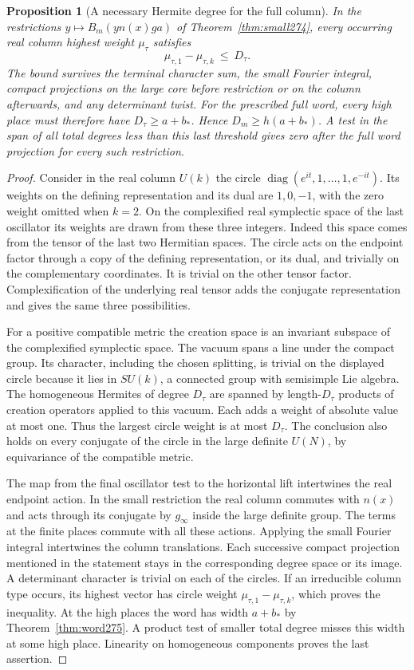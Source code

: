 \documentclass[a4paper,11pt]{article}
\newtheorem{proposition}{Proposition}[section]
\theoremstyle{definition}
\theoremstyle{remark}
\numberwithin{equation}{section}
\begin{document}
\begin{proposition}[A necessary Hermite degree for the full column]\leavevmode
\label{prop:degree275}
In the restrictions \(y\mapsto B_m(y n(x)g a)\) of
Theorem~\ref{thm:small274}, every occurring real column
highest weight \(\mu_\tau\) satisfies
\[
         \mu_{\tau,1}-\mu_{\tau,k}\ \le\ D_\tau .
\]
The bound survives the terminal character sum, the small
Fourier integral, compact projections on the large core
before restriction or on the column afterwards, and any
determinant twist. For the prescribed full word, every high
place must therefore have \(D_\tau\ge a+b_*\). Hence
\(D_m\ge h(a+b_*)\). A test in the span of all total degrees
less than this last threshold gives zero after the full
word projection for every such restriction.
\end{proposition}
\begin{proof}
Consider in the real column \(U(k)\) the circle
\(\operatorname{diag}(e^{it},1,\ldots,1,e^{-it})\). Its
weights on the defining representation and its dual are
\(1,0,-1\), with the zero weight omitted when \(k=2\).
On the complexified real symplectic space of the last
oscillator its weights are drawn from these three integers.
Indeed this space comes from the tensor of the last two
Hermitian spaces. The circle acts on the endpoint factor
through a copy of the defining representation, or its dual,
and trivially on the complementary coordinates. It is
trivial on the other tensor factor. Complexification of the
underlying real tensor adds the conjugate representation
and gives the same three possibilities.

For a positive compatible metric the creation space is an
invariant subspace of the complexified symplectic space.
The vacuum spans a line under the compact group. Its
character, including the chosen splitting, is trivial on the
displayed circle because it lies in \(SU(k)\), a connected
group with semisimple Lie algebra. The homogeneous Hermites
of degree \(D_\tau\) are spanned by length-\(D_\tau\)
products of creation operators applied to this vacuum.
Each adds a weight of absolute value at most one. Thus the
largest circle weight is at most \(D_\tau\).
The conclusion also holds on every conjugate of the circle
in the large definite \(U(N)\), by equivariance of the
compatible metric.

The map from the final oscillator test to the horizontal
lift intertwines the real endpoint action. In the small
restriction the real column commutes with \(n(x)\) and
acts through its conjugate by \(g_\infty\) inside the large
definite group. The terms at the finite places commute with
all these actions. Applying the small Fourier integral
intertwines the column translations. Each successive
compact projection mentioned in the statement stays in the
corresponding degree space or its image. A determinant
character is trivial on each of the circles. If an
irreducible column type occurs, its highest vector has
circle weight \(\mu_{\tau,1}-\mu_{\tau,k}\), which proves
the inequality. At the high places the word has width
\(a+b_*\) by Theorem~\ref{thm:word275}. A product test of
smaller total degree misses this width at some high place.
Linearity on homogeneous components proves the last assertion.
\end{proof}
\end{document}
